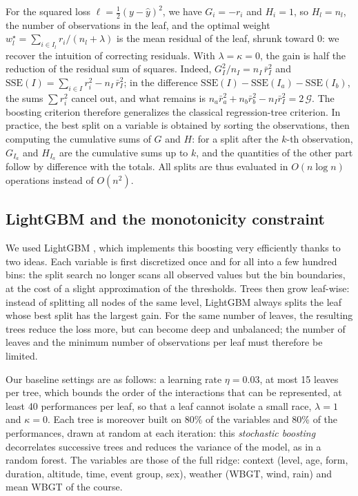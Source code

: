 \documentclass[11pt,a4paper]{article}
\begin{document}
For the squared loss $\ell = \frac12(y - \hat y)^2$, we have $G_i = -r_i$ and $H_i = 1$, so $H_l = n_l$, the number of
observations in the leaf, and the optimal weight $w_l^\star = \sum_{i \in I_l} r_i/(n_l + \lambda)$ is the mean
residual of the leaf, shrunk toward 0: we recover the intuition of correcting residuals. With $\lambda = \kappa = 0$,
the gain is half the reduction of the residual sum of squares. Indeed, $G_I^2/n_I = n_I\,\bar r_I^2$ and
$\mathrm{SSE}(I) = \sum_{i \in I} r_i^2 - n_I\,\bar r_I^2$; in the difference
$\mathrm{SSE}(I) - \mathrm{SSE}(I_a) - \mathrm{SSE}(I_b)$, the sums $\sum r_i^2$ cancel out, and what remains is
$n_a \bar r_a^2 + n_b \bar r_b^2 - n_I \bar r_I^2 = 2\,\mathcal G$. The boosting criterion therefore generalizes the
classical regression-tree criterion. In practice, the best split on a variable is obtained by sorting the
observations, then computing the cumulative sums of $G$ and $H$: for a split after the $k$-th observation, $G_{I_a}$ and
$H_{I_a}$ are the cumulative sums up to $k$, and the quantities of the other part follow by difference with the totals.
All splits are thus evaluated in $O(n \log n)$ operations instead of $O(n^2)$.

\subsection{LightGBM and the monotonicity constraint}\label{sec:monotonicity}

We used LightGBM \citep{ke2017}, which implements this boosting very efficiently thanks to two ideas. Each variable is
first discretized once and for all into a few hundred bins: the split search no longer scans all observed values but
the bin boundaries, at the cost of a slight approximation of the thresholds. Trees then grow leaf-wise: instead of
splitting all nodes of the same level, LightGBM always splits the leaf whose best split has the largest gain. For the
same number of leaves, the resulting trees reduce the loss more, but can become deep and unbalanced; the number of
leaves and the minimum number of observations per leaf must therefore be limited.

Our baseline settings are as follows: a learning rate $\eta = 0.03$, at most 15 leaves per tree, which bounds the order
of the interactions that can be represented, at least 40 performances per leaf, so that a leaf cannot isolate a small
race, $\lambda = 1$ and $\kappa = 0$. Each tree is moreover built on 80\% of the variables and 80\% of the performances,
drawn at random at each iteration: this \emph{stochastic boosting} decorrelates successive trees and reduces the
variance of the model, as in a random forest. The variables are those of the full ridge: context (level, age, form,
duration, altitude, time, event group, sex), weather (WBGT, wind, rain) and mean WBGT of the course.
\end{document}
